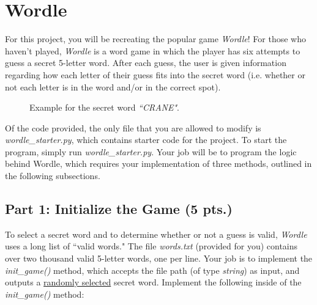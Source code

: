 \documentclass{article}
\begin{document}
\pagestyle{fancy}

\section{Wordle}
\hspace{\parindent}For this project, you will be recreating the popular game \emph{Wordle}! For those who haven't played, \emph{Wordle} is a word game in which the player has six attempts to guess a secret 5-letter word. After each guess, the user is given information regarding how each letter of their guess fits into the secret word (i.e. whether or not each letter is in the word and/or in the correct spot).

\vspace{0.5cm}

\begin{figure}[h!]
    \centering
    \caption{Example for the secret word \emph{``CRANE"}.}
\end{figure}

\vspace{1cm}

Of the code provided, the only file that you are allowed to modify is \emph{wordle\_starter.py}, which contains starter code for the project. To start the program, simply run \emph{wordle\_starter.py}. Your job will be to program the logic behind Wordle, which requires your implementation of three methods, outlined in the following subsections.

\subsection{Part 1: Initialize the Game (5 pts.)}
\hspace{\parindent} To select a secret word and to determine whether or not a guess is valid, \emph{Wordle} uses a long list of ``valid words." The file \emph{words.txt} (provided for you) contains over two thousand valid 5-letter words, one per line. Your job is to implement the \emph{init\_game()} method, which accepts the file path  (of type \emph{string}) as input, and outputs a \underline{randomly selected} secret word. Implement the following inside of the \emph{init\_game()} method:
\end{document}
